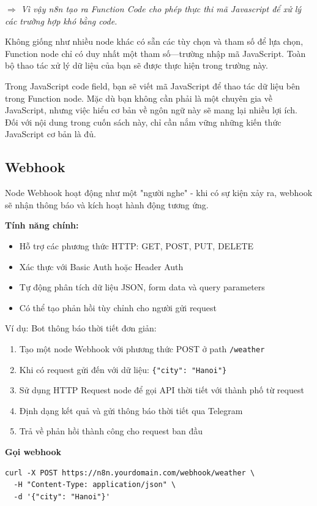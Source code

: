 $\Rightarrow$ \textit{Vì vậy n8n tạo ra Function Code cho phép thực thi mã Javascript để xử lý các trường hợp khó bằng code. }

Không giống như nhiều node khác có sẵn các tùy chọn và tham số để lựa chọn, Function node chỉ có duy nhất một tham số—trường nhập mã JavaScript. Toàn bộ thao tác xử lý dữ liệu của bạn sẽ được thực hiện trong trường này.

Trong JavaScript code field, bạn sẽ viết mã JavaScript để thao tác dữ liệu bên trong Function node.
Mặc dù bạn không cần phải là một chuyên gia về JavaScript, nhưng việc hiểu cơ bản về ngôn ngữ này sẽ mang lại nhiều lợi ích. Đối với nội dung trong cuốn sách này, chỉ cần nắm vững những kiến thức JavaScript cơ bản là đủ.


\subsection{Webhook}
Node Webhook hoạt động như một "người nghe" - khi có sự kiện xảy ra, webhook sẽ nhận thông báo và kích hoạt hành động tương ứng.

\textbf{Tính năng chính:}

\begin{itemize}
    \item Hỗ trợ các phương thức HTTP: GET, POST, PUT, DELETE
    \item Xác thực với Basic Auth hoặc Header Auth  
    \item Tự động phân tích dữ liệu JSON, form data và query parameters
    \item Có thể tạo phản hồi tùy chỉnh cho người gửi request
\end{itemize}

Ví dụ: Bot thông báo thời tiết đơn giản:

\begin{enumerate}
    \item Tạo một node Webhook với phương thức POST ở path \texttt{/weather}
    \item Khi có request gửi đến với dữ liệu: \texttt{\{"city": "Hanoi"\}}
    \item Sử dụng HTTP Request node để gọi API thời tiết với thành phố từ request
    \item Định dạng kết quả và gửi thông báo thời tiết qua Telegram
    \item Trả về phản hồi thành công cho request ban đầu
\end{enumerate}

\textbf{Gọi webhook}
\begin{lstlisting}
curl -X POST https://n8n.yourdomain.com/webhook/weather \
  -H "Content-Type: application/json" \
  -d '{"city": "Hanoi"}'
\end{lstlisting}

